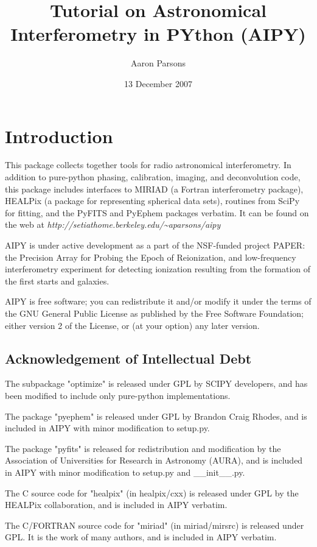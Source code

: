 \documentclass[10pt]{article}
\title{Tutorial on Astronomical Interferometry in PYthon (AIPY)}
\author{Aaron Parsons}
\date{13 December 2007}
\begin{document}
\maketitle
\tableofcontents 

\section{Introduction}

This package collects together tools for radio astronomical interferometry.  In
addition to pure-python phasing, calibration, imaging, and
deconvolution code, this package includes interfaces to MIRIAD (a Fortran
interferometry package), HEALPix (a package for representing spherical data
sets), routines from SciPy for fitting, and the PyFITS and PyEphem packages
verbatim.  It can be found on the web at
{\it http://setiathome.berkeley.edu/\~{}aparsons/aipy}

AIPY is under active development as a part of the NSF-funded project
PAPER: the Precision Array for Probing the Epoch of Reionization, and 
low-frequency interferometry experiment for detecting ionization resulting
from the formation of the first starts and galaxies.

AIPY is free software; you can redistribute it and/or modify it under
the terms of the GNU General Public License as published by the Free Software
Foundation; either version 2 of the License, or (at your option) any later
version.

\subsection{Acknowledgement of Intellectual Debt}

The subpackage "optimize" is released under GPL by SCIPY developers, and
has been modified to include only pure-python implementations.

The package "pyephem" is released under GPL by Brandon Craig Rhodes, and
is included in AIPY with minor modification to setup.py.

The package "pyfits" is released for redistribution and modification by
the Association of Universities for Research in Astronomy (AURA), and
is included in AIPY with minor modification to setup.py and \_\_init\_\_.py.

The C source code for "healpix" (in healpix/cxx) is released under GPL
by the HEALPix collaboration, and is included in AIPY verbatim.

The C/FORTRAN source code for "miriad" (in miriad/mirsrc) is released under
GPL. It is the work of many authors, and is included in AIPY verbatim.
\end{document}
